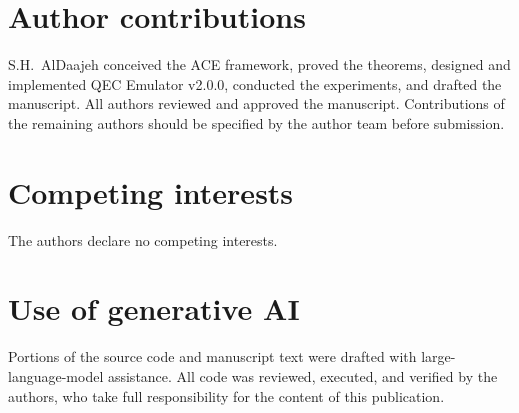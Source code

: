 \documentclass[pdflatex,sn-mathphys-num]{sn-jnl}
\theoremstyle{thmstyleone}
\theoremstyle{thmstyletwo}
\theoremstyle{thmstylethree}
\begin{document}
\section*{Author contributions}
S.H.\ AlDaajeh conceived the ACE framework, proved the theorems, designed and implemented QEC Emulator v2.0.0, conducted the experiments, and drafted the manuscript. All authors reviewed and approved the manuscript. Contributions of the remaining authors should be specified by the author team before submission.

\section*{Competing interests} The authors declare no competing interests.

\section*{Use of generative AI}
Portions of the source code and manuscript text were drafted with large-language-model assistance. All code was reviewed, executed, and verified by the authors, who take full responsibility for the content of this publication.

\appendix
\end{document}

